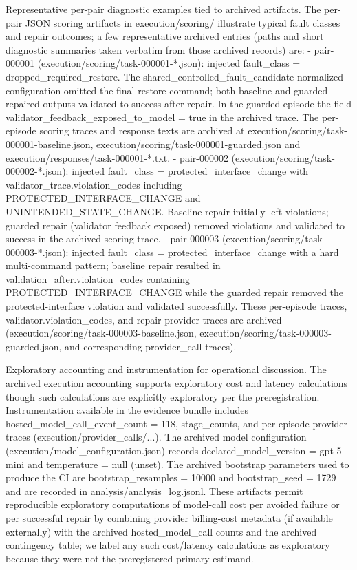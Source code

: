 \documentclass[conference]{IEEEtran}
\begin{document}
Representative per-pair diagnostic examples tied to archived artifacts. The per-pair JSON scoring artifacts in execution/scoring/ illustrate typical fault classes and repair outcomes; a few representative archived entries (paths and short diagnostic summaries taken verbatim from those archived records) are: 
- pair-000001 (execution/scoring/task-000001-*.json): injected fault\_class = dropped\_required\_restore. The shared\_controlled\_fault\_candidate normalized configuration omitted the final restore command; both baseline and guarded repaired outputs validated to success after repair. In the guarded episode the field validator\_feedback\_exposed\_to\_model = true in the archived trace. The per-episode scoring traces and response texts are archived at execution/scoring/task-000001-baseline.json, execution/scoring/task-000001-guarded.json and execution/responses/task-000001-*.txt.
- pair-000002 (execution/scoring/task-000002-*.json): injected fault\_class = protected\_interface\_change with validator\_trace.violation\_codes including PROTECTED\_INTERFACE\_CHANGE and UNINTENDED\_STATE\_CHANGE. Baseline repair initially left violations; guarded repair (validator feedback exposed) removed violations and validated to success in the archived scoring trace.
- pair-000003 (execution/scoring/task-000003-*.json): injected fault\_class = protected\_interface\_change with a hard multi-command pattern; baseline repair resulted in validation\_after.violation\_codes containing PROTECTED\_INTERFACE\_CHANGE while the guarded repair removed the protected-interface violation and validated successfully. These per-episode traces, validator.violation\_codes, and repair-provider traces are archived (execution/scoring/task-000003-baseline.json, execution/scoring/task-000003-guarded.json, and corresponding provider\_call traces).

Exploratory accounting and instrumentation for operational discussion. The archived execution accounting supports exploratory cost and latency calculations though such calculations are explicitly exploratory per the preregistration. Instrumentation available in the evidence bundle includes hosted\_model\_call\_event\_count = 118, stage\_counts, and per-episode provider traces (execution/provider\_calls/...). The archived model configuration (execution/model\_configuration.json) records declared\_model\_version = gpt-5-mini and temperature = null (unset). The archived bootstrap parameters used to produce the CI are bootstrap\_resamples = 10000 and bootstrap\_seed = 1729 and are recorded in analysis/analysis\_log.jsonl. These artifacts permit reproducible exploratory computations of model-call cost per avoided failure or per successful repair by combining provider billing-cost metadata (if available externally) with the archived hosted\_model\_call counts and the archived contingency table; we label any such cost/latency calculations as exploratory because they were not the preregistered primary estimand.
\end{document}
